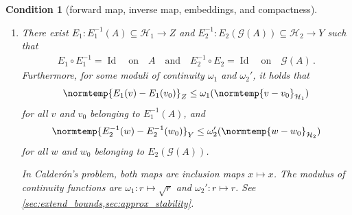 \documentclass[pdflatex,sn-mathphys-num]{sn-jnl-preprint}
\newcommand{\C}{\mathbb{C}}
\newcommand{\cH}{\mathcal{H}}
\newcommand{\cG}{\mathcal{G}}
\newcommand{\pOmega}{{\partial\Omega}}
\newcommand{\norm}{\normtemp}
\DeclareMathOperator{\Id}{Id} %
\newcommand{\HS}{\mathrm{HS}} %
\def\qa{\quad\text{and}\quad}
\def\qon{\quad\text{on}\quad}
\theoremstyle{thmstyleone}%
\theoremstyle{thmstyletwo}%
\theoremstyle{thmstylethree}%
\newtheorem{condition}{Condition}%
\numberwithin{equation}{section}
\numberwithin{theorem}{section}
\begin{document}
\begin{condition}[forward map, inverse map, embeddings, and compactness]
\begin{enumerate}[label=(\roman*),leftmargin=1.25\parindent,topsep=1.67ex,itemsep=0.5ex,partopsep=1ex,parsep=1ex]
		\emph{The modulus of continuity functions $\omega_1'$ and $\omega_2$ may be obtained using interpolation of Banach spaces or related arguments. In Calder\'on's problem, $\cH_1=\HS(H^s_\diamond(\pOmega);H^t(\pOmega)/\C)$ and $\cH_2=L^2(\Omega)$. Each map has action $x\mapsto x$. The modulus $\omega_1'$ can be taken to be $r\mapsto \sqrt{r}$. If $Y\subseteq L^2(\Omega)$, then $E_2$ can be taken to be the identity operator on $Y$ with modulus $\omega_2(r)=r$. See \cref{sec:extend_bounds,sec:approx_stability}.}
		
		\item There exist $E_1\colon {E_1^{-1}(A)\subseteq \cH_1} \to Z $ and  $E_2^{-1} \colon {E_2(\cG(A))\subseteq \cH_2} \to Y$ such that
		\begin{align}
			E_1\circ E_1^{-1}=\Id \qon A\qa E_2^{-1}\circ E_2=\Id\qon \cG(A)\,.
		\end{align}
		Furthermore, for some moduli of continuity $\omega_1$ and $\omega_2'$, it holds that
		\begin{align}
			\norm{E_1(v)-E_1(v_0)}_Z \leq \omega_1(\norm{v-v_0}_{\cH_1})   
		\end{align}
        for all $v$ and $v_0$ belonging to $E_1^{-1}(A)$, and
        \begin{align}
            \norm{E_2^{-1}(w)-E_2^{-1}(w_0)}_Y \leq \omega_2'(\norm{w-w_0}_{\cH_2}) 
        \end{align}
        for all $w$ and $w_0$ belonging to $E_2(\cG(A))$.
        
		\emph{In Calder\'on's problem, both maps are inclusion maps $x\mapsto x$.
		The modulus of continuity functions are $\omega_1\colon r\mapsto\sqrt{r}$ and $\omega_2'\colon r\mapsto r$. See \cref{sec:extend_bounds,sec:approx_stability}.
        }
	\end{enumerate}
\end{condition}
\end{document}

